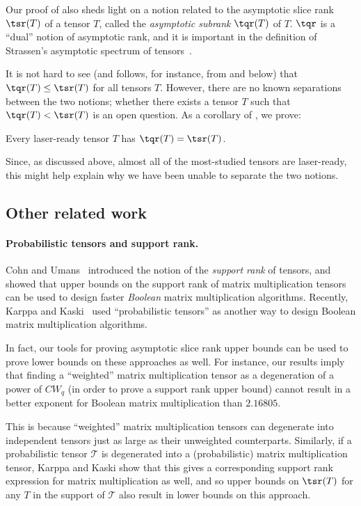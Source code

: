 \documentclass{toc}
\begin{document}
Our proof of  also sheds light on a notion related to the asymptotic slice rank $\tsr(T)$ of a tensor $T$, called the \emph{asymptotic subrank} $\tqr(T)$ of $T$. $\tqr$ is a ``dual'' notion of asymptotic rank, and it is important in the definition of Strassen's asymptotic spectrum of tensors~\cite{strassenlaser1}. 

It is not hard to see (and follows, for instance, from  and  below) that $\tqr(T) \leq \tsr(T)$ for all tensors $T$. However, there are no known separations between the two notions; whether there exists a tensor $T$ such that $\tqr(T) < \tsr(T)$ is an open question. As a corollary of , we prove:
\begin{corollary} \label{introsubrankcor}
Every laser-ready tensor $T$ has $\tqr(T) = \tsr(T)$.
\end{corollary}
\noindent Since, as discussed above, almost all of the most-studied tensors are laser-ready, this might help explain why we have been unable to separate the two notions.




%
\subsection{Other related work} \label{sec:relatedwork}

%
\paragraph{Probabilistic tensors and support rank.}
Cohn and Umans~\cite{cohn2013fast} introduced the notion of the \emph{support rank} of tensors, and showed that upper bounds on the support rank of matrix multiplication tensors can be used to design faster \emph{Boolean} matrix multiplication algorithms. Recently, Karppa and Kaski~\cite{karppa2019probabilistic} used ``probabilistic tensors'' as another way to design Boolean matrix multiplication algorithms. 

In fact, our tools for proving asymptotic slice rank upper bounds can be used to prove lower bounds on these approaches as well. For instance, our results imply that finding a ``weighted'' matrix multiplication tensor as a degeneration of a power of $CW_q$ (in order to prove a support rank upper bound) cannot result in a better exponent for Boolean matrix multiplication than $2.16805$. 

This is because ``weighted'' matrix multiplication tensors can degenerate into independent tensors just as large as their unweighted counterparts. Similarly, if a probabilistic tensor $\mathcal{T}$ is degenerated into a (probabilistic) matrix multiplication tensor, Karppa and Kaski show that this gives a corresponding support rank expression for matrix multiplication as well, and so upper bounds on $\tsr(T)$ for any $T$ in the support of $\mathcal{T}$ also result in lower bounds on this approach. 
\end{document}
